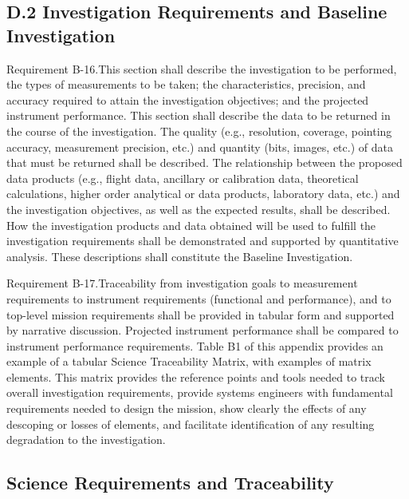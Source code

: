 \documentclass[12pt,journal]{IEEEtran}
\begin{document}
\subsection{D.2 Investigation Requirements and Baseline Investigation}
{Requirement B-16.This section shall describe the investigation to be performed, the types of measurements to be taken; the characteristics, precision, and accuracy required to attain the investigation objectives; and the projected instrument performance. This section shall describe the data to be returned in the course of the investigation. The quality (e.g., resolution, coverage, pointing accuracy, measurement precision, etc.) and quantity (bits, images, etc.) of data that must be returned shall be described. The relationship between the proposed data products (e.g., flight data, ancillary or calibration data, theoretical calculations, higher order analytical or data products, laboratory data, etc.) and the investigation objectives, as well as the expected results, shall be described. How the investigation products and data obtained will be used to fulfill the investigation requirements shall be demonstrated and supported by quantitative analysis. These descriptions shall constitute the Baseline Investigation. 

Requirement B-17.Traceability from investigation goals to measurement requirements to instrument requirements (functional and performance), and to top-level mission requirements shall be provided in tabular form and supported by narrative discussion. Projected instrument performance shall be compared to instrument performance requirements. Table B1 of this appendix provides an example of a tabular Science Traceability Matrix, with examples of matrix elements. This matrix provides the reference points and tools needed to track overall investigation requirements, provide systems engineers with fundamental requirements needed to design the mission, show clearly the effects of any descoping or losses of elements, and facilitate identification of any resulting degradation to the investigation. }



\subsection{Science Requirements and Traceability}\label{sec:scitraceability}

\label{tab:scitraceability}
\end{document}
